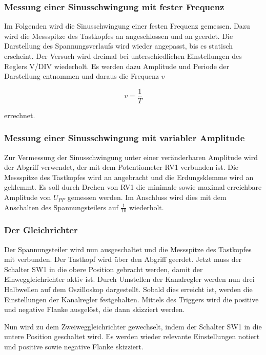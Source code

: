 \subsubsection{Messung einer Sinusschwingung mit fester Frequenz}

Im Folgenden wird die Sinusschwingung einer festen Frequenz gemessen. Dazu wird die Messspitze des Tastkopfes an  angeschlossen und an  geerdet. Die Darstellung des Spannungsverlaufs wird wieder angepasst, bis es statisch erscheint. Der Versuch wird dreimal bei unterschiedlichen Einstellungen des Reglers V/DIV wiederholt. Es werden dazu Amplitude und Periode der Darstellung entnommen und daraus die Frequenz $v$

\begin{equation}
	v = \frac{1}{T}
\end{equation}

errechnet.\cite{V300}

\subsubsection{Messung einer Sinusschwingung mit variabler Amplitude}

Zur Vermessung der Sinusschwingung unter einer veränderbaren Amplitude wird der Abgriff  verwendet, der mit dem Potentiometer RV1 verbunden ist. Die Messspitze des Tastkopfes wird an  angebracht und die Erdungsklemme wird an  geklemmt. Es soll durch Drehen von RV1 die minimale sowie maximal erreichbare Amplitude von $U_{PP}$ gemessen werden. Im Anschluss wird dies mit dem Anschalten des Spannungsteilers auf $\frac{1}{10}$ wiederholt.

\subsubsection{Der Gleichrichter}

Der Spannungsteiler wird nun ausgeschaltet und die Messspitze des Tastkopfes mit  verbunden. Der Tastkopf wird über den Abgriff  geerdet.
Jetzt muss der Schalter SW1 in die obere Position gebracht werden, damit der Einweggleichrichter aktiv ist. Durch Umstellen der Kanalregler werden nun drei Halbwellen auf dem Oszilloskop dargestellt. Sobald dies erreicht ist, werden die Einstellungen der Kanalregler festgehalten. Mittels des Triggers wird die positive und negative Flanke ausgelöst, die dann skizziert werden.

Nun wird zu dem Zweiweggleichrichter gewechselt, indem der Schalter SW1 in die untere Position geschaltet wird. Es werden wieder relevante Einstellungen notiert und positive sowie negative Flanke skizziert.

